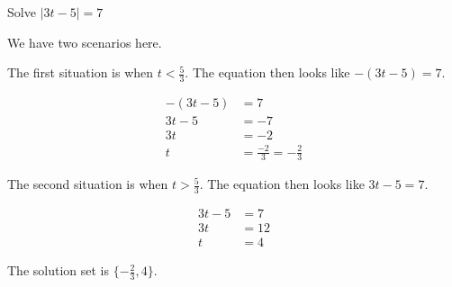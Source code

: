 \documentclass{ximera}
\begin{document}
\begin{example}


Solve $| 3t - 5 | = 7$

\begin{explanation}

We have two scenarios here.

The first situation is when $t < \frac{5}{3}$.  The equation then looks like $-(3t - 5) = 7$.

\begin{align*}
-(3t - 5) & = 7 \\
3t - 5 & = -7  \\
3t & = -2  \\
t & = \frac{-2}{3} = -\frac{2}{3}
\end{align*}



The second situation is when $t > \frac{5}{3}$.  The equation then looks like $3t - 5 = 7$.

\begin{align*}
3t - 5 & = 7 \\
3t  & = 12  \\
t & = 4
\end{align*}


The solution set is $\{  -\frac{2}{3}, 4 \}$.


\end{explanation}

\end{example}
\end{document}
